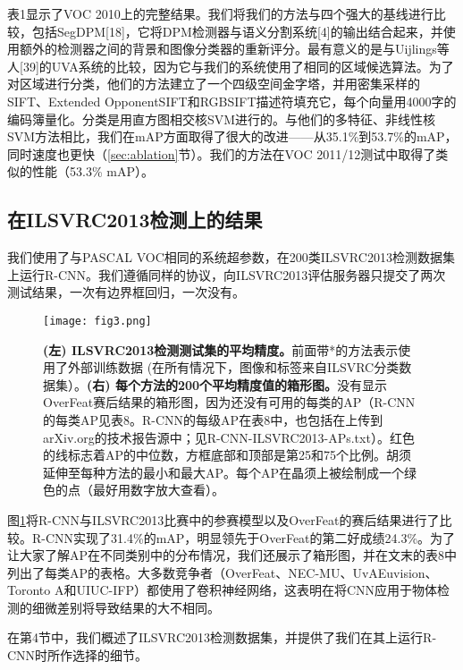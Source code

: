 \documentclass[../main.tex]{subfile}
\begin{document}
表1显示了VOC 2010上的完整结果。我们将我们的方法与四个强大的基线进行比较，包括SegDPM[18]，它将DPM检测器与语义分割系统[4]的输出结合起来，并使用额外的检测器之间的背景和图像分类器的重新评分。最有意义的是与Uijlings等人[39]的UVA系统的比较，因为它与我们的系统使用了相同的区域候选算法。为了对区域进行分类，他们的方法建立了一个四级空间金字塔，并用密集采样的SIFT、Extended OpponentSIFT和RGBSIFT描述符填充它，每个向量用4000字的编码簿量化。分类是用直方图相交核SVM进行的。与他们的多特征、非线性核SVM方法相比，我们在mAP方面取得了很大的改进——从35.1\%到53.7\%的mAP，同时速度也更快（\ref{sec:ablation}节）。我们的方法在VOC 2011/12测试中取得了类似的性能（53.3\% mAP）。

\subsection{在ILSVRC2013检测上的结果}

我们使用了与PASCAL VOC相同的系统超参数，在200类ILSVRC2013检测数据集上运行R-CNN。我们遵循同样的协议，向ILSVRC2013评估服务器只提交了两次测试结果，一次有边界框回归，一次没有。

\begin{figure}[htb]
    \centering
    \texttt{[image: fig3.png]}
    \caption{\textbf{(左) ILSVRC2013检测测试集的平均精度。}前面带*的方法表示使用了外部训练数据 (在所有情况下，图像和标签来自ILSVRC分类数据集）。\textbf{(右) 每个方法的200个平均精度值的箱形图。}没有显示OverFeat赛后结果的箱形图，因为还没有可用的每类的AP（R-CNN的每类AP见表8。R-CNN的每级AP在表8中，也包括在上传到arXiv.org的技术报告源中；见R-CNN-ILSVRC2013-APs.txt）。红色的线标志着AP的中位数，方框底部和顶部是第25和75个比例。胡须延伸至每种方法的最小和最大AP。每个AP在晶须上被绘制成一个绿色的点（最好用数字放大查看）。}
    \label{fig:fig3}
\end{figure}

图\ref{fig:fig3}将R-CNN与ILSVRC2013比赛中的参赛模型以及OverFeat\cite{overfeat}的赛后结果进行了比较。R-CNN实现了31.4\%的mAP，明显领先于OverFeat的第二好成绩24.3\%。为了让大家了解AP在不同类别中的分布情况，我们还展示了箱形图，并在文末的表8中列出了每类AP的表格。大多数竞争者（OverFeat、NEC-MU、UvAEuvision、Toronto A和UIUC-IFP）都使用了卷积神经网络，这表明在将CNN应用于物体检测的细微差别将导致结果的大不相同。

在第4节中，我们概述了ILSVRC2013检测数据集，并提供了我们在其上运行R-CNN时所作选择的细节。
\end{document}
